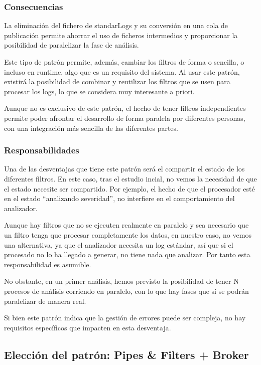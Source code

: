 \documentclass[11pt]{article}
\begin{document}
\subsubsection{Consecuencias}

La eliminación del fichero de standarLogs y su conversión en una cola de publicación permite ahorrar el uso de ficheros intermedios y proporcionar la posibilidad de paralelizar la fase de análisis.

Este tipo de patrón permite, además, cambiar los filtros de forma o sencilla, o incluso en runtime, algo que es un requisito del sistema. Al usar este patrón, existirá la posibilidad de combinar y reutilizar los filtros que se usen para procesar los logs, lo que se considera muy interesante a priori.

Aunque no es exclusivo de este patrón, el hecho de tener filtros independientes permite poder afrontar el desarrollo de forma paralela por diferentes personas, con una integración más sencilla de las diferentes partes.

\subsubsection{Responsabilidades}

Una de las desventajas que tiene este patrón será el compartir el estado de los diferentes filtros. En este caso, tras el estudio incial, no vemos la necesidad de que el estado necesite ser compartido. Por ejemplo, el hecho de que el procesador esté en el estado “analizando severidad”, no interfiere en el comportamiento del analizador.

Aunque hay filtros que no se ejecuten realmente en paralelo y sea necesario que un filtro tenga que procesar completamente los datos, en nuestro caso, no vemos una alternativa, ya que el analizador necesita un log estándar, así que si el procesado no lo ha llegado a generar, no tiene nada que analizar. Por tanto esta responsabilidad es asumible.

No obstante, en un primer análisis, hemos previsto la posibilidad de tener N procesos de análisis corriendo en paralelo, con lo que hay fases que sí se podrán paralelizar de manera real.

Si bien este patrón indica que la gestión de errores puede ser compleja, no hay requisitos específicos que impacten en esta desventaja.

\subsection{Elección del patrón: Pipes \& Filters + Broker}
\end{document}

